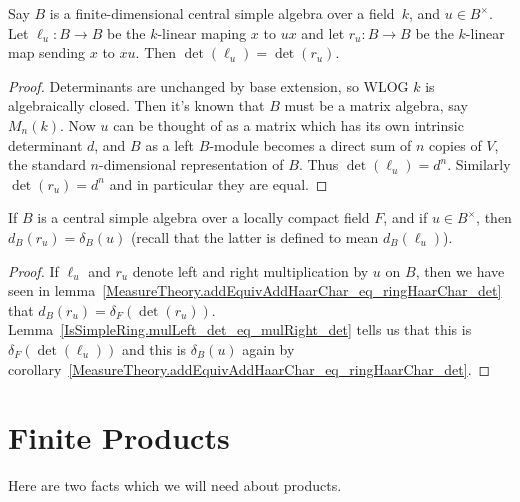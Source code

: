 \begin{lemma}
  \label{IsSimpleRing.mulLeft_det_eq_mulRight_det}
  \leanok
  Say $B$ is a finite-dimensional central simple algebra over a field~$k$,
  and $u\in B^\times$. Let $\ell_u:B\to B$ be the $k$-linear maping $x$ to $ux$ and
  let $r_u:B\to B$ be the $k$-linear map sending $x$ to $xu$. Then
  $\det(\ell_u)=\det(r_u)$.
\end{lemma}
\begin{proof}
  \leanok
  Determinants are unchanged by base extension, so WLOG $k$ is algebraically closed.
  Then it's known that $B$ must be a matrix algebra, say $M_n(k)$. Now $u$ can be thought
  of as a matrix which has its own intrinsic determinant $d$, and $B$ as a left $B$-module
  becomes a direct sum of $n$ copies of $V$, the standard $n$-dimensional representation of $B$.
  Thus $\det(\ell_u)=d^n$. Similarly $\det(r_u)=d^n$ and in particular they are equal.
\end{proof}

\begin{corollary}
  \label{IsSimpleRing.ringHaarChar_eq_addEquivAddHaarChar_mulRight}
  \leanok
  If $B$ is a central simple algebra over a locally compact field $F$, and if $u\in B^\times$,
  then $d_B(r_u)=\delta_B(u)$ (recall that the latter is defined to mean $d_B(\ell_u)$).
\end{corollary}
\begin{proof}
  \leanok
  If $\ell_u$ and $r_u$ denote left and right multiplication by $u$ on $B$, then we have
  seen in lemma~\ref{MeasureTheory.addEquivAddHaarChar_eq_ringHaarChar_det} that $d_B(r_u)=\delta_F(\det(r_u))$.
  Lemma~\ref{IsSimpleRing.mulLeft_det_eq_mulRight_det} tells
  us that this is $\delta_F(\det(\ell_u))$ and this is $\delta_B(u)$ again by
  corollary~\ref{MeasureTheory.addEquivAddHaarChar_eq_ringHaarChar_det}.
\end{proof}

\section{Finite Products}

Here are two facts which we will need about products.

